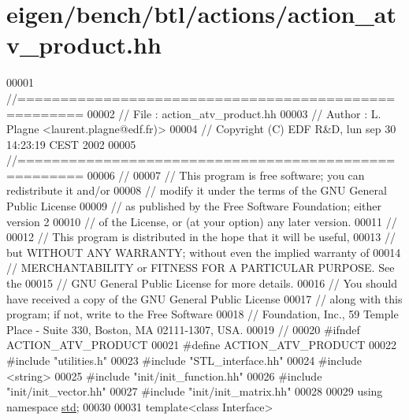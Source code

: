 \hypertarget{eigen_2bench_2btl_2actions_2action__atv__product_8hh_source}{}\section{eigen/bench/btl/actions/action\+\_\+atv\+\_\+product.hh}
\label{eigen_2bench_2btl_2actions_2action__atv__product_8hh_source}

\begin{DoxyCode}
00001 \textcolor{comment}{//=====================================================}
00002 \textcolor{comment}{// File   :  action\_atv\_product.hh}
00003 \textcolor{comment}{// Author :  L. Plagne <laurent.plagne@edf.fr)>}
00004 \textcolor{comment}{// Copyright (C) EDF R&D,  lun sep 30 14:23:19 CEST 2002}
00005 \textcolor{comment}{//=====================================================}
00006 \textcolor{comment}{//}
00007 \textcolor{comment}{// This program is free software; you can redistribute it and/or}
00008 \textcolor{comment}{// modify it under the terms of the GNU General Public License}
00009 \textcolor{comment}{// as published by the Free Software Foundation; either version 2}
00010 \textcolor{comment}{// of the License, or (at your option) any later version.}
00011 \textcolor{comment}{//}
00012 \textcolor{comment}{// This program is distributed in the hope that it will be useful,}
00013 \textcolor{comment}{// but WITHOUT ANY WARRANTY; without even the implied warranty of}
00014 \textcolor{comment}{// MERCHANTABILITY or FITNESS FOR A PARTICULAR PURPOSE.  See the}
00015 \textcolor{comment}{// GNU General Public License for more details.}
00016 \textcolor{comment}{// You should have received a copy of the GNU General Public License}
00017 \textcolor{comment}{// along with this program; if not, write to the Free Software}
00018 \textcolor{comment}{// Foundation, Inc., 59 Temple Place - Suite 330, Boston, MA  02111-1307, USA.}
00019 \textcolor{comment}{//}
00020 \textcolor{preprocessor}{#ifndef ACTION\_ATV\_PRODUCT}
00021 \textcolor{preprocessor}{#define ACTION\_ATV\_PRODUCT}
00022 \textcolor{preprocessor}{#include "utilities.h"}
00023 \textcolor{preprocessor}{#include "STL\_interface.hh"}
00024 \textcolor{preprocessor}{#include <string>}
00025 \textcolor{preprocessor}{#include "init/init\_function.hh"}
00026 \textcolor{preprocessor}{#include "init/init\_vector.hh"}
00027 \textcolor{preprocessor}{#include "init/init\_matrix.hh"}
00028 
00029 \textcolor{keyword}{using namespace }\hyperlink{namespacestd}{std};
00030 
00031 \textcolor{keyword}{template}<\textcolor{keyword}{class} Interface>

\end{DoxyCode}
